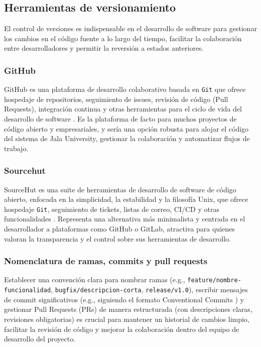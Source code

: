 \subsection{Herramientas de versionamiento}
El control de versiones es indispensable en el desarrollo de software para gestionar los cambios en el código fuente a lo largo del tiempo, facilitar la colaboración entre desarrolladores y permitir la reversión a estados anteriores.

\subsubsection{GitHub}
GitHub es una plataforma de desarrollo colaborativo basada en \texttt{Git} que ofrece hospedaje de repositorios, seguimiento de issues, revisión de código (Pull Requests), integración continua y otras herramientas para el ciclo de vida del desarrollo de software \parencite{GitHub}.
Es la plataforma de facto para muchos proyectos de código abierto y empresariales, y sería una opción robusta para alojar el código del sistema de Jala University, gestionar la colaboración y automatizar flujos de trabajo.

\subsubsection{Sourcehut}
SourceHut es una suite de herramientas de desarrollo de software de código abierto, enfocada en la simplicidad, la estabilidad y la filosofía Unix, que ofrece hospedaje \texttt{Git}, seguimiento de tickets, listas de correo, CI/CD y otras funcionalidades \parencite{SourceHut}.
Representa una alternativa más minimalista y centrada en el desarrollador a plataformas como GitHub o GitLab, atractiva para quienes valoran la transparencia y el control sobre sus herramientas de desarrollo.

\subsubsection{Nomenclatura de ramas, commits y pull requests}
Establecer una convención clara para nombrar ramas (e.g., \texttt{feature/nombre-funcionalidad}, \texttt{bugfix/descripcion-corta}, \texttt{release/v1.0}), escribir mensajes de commit significativos (e.g., siguiendo el formato Conventional Commits \parencite{ConventionalCommits}) y gestionar Pull Requests (PRs) de manera estructurada (con descripciones claras, revisiones obligatorias) es crucial para mantener un historial de cambios limpio, facilitar la revisión de código y mejorar la colaboración dentro del equipo de desarrollo del proyecto.
